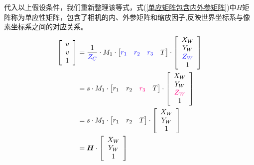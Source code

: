 \documentclass{article}
\begin{document}
代入以上假设条件，我们重新整理该等式，式(\ref{单应矩阵包含内外参矩阵})中$H$矩阵称为单应性矩阵，包含了相机的内、外参矩阵和缩放因子,反映世界坐标系与像素坐标系之间的对应关系。
	\begin{align}
	\left[ \begin{array}{c}
		u\\
		v\\
		1\\
	\end{array} \right] &=\frac{1}{{\color{blue} Z_C}}\cdot M_1\cdot \left[ \begin{matrix}
		{\color{blue} r_1}&		{\color{blue} r_2}&		{\color{blue} r_3}&		T\\
	\end{matrix} \right] \cdot \left[ \begin{array}{c}
		X_W\\
		Y_W\\
		{\color{blue} Z_W}\\
		1\\
	\end{array} \right] \nonumber
	\\
	&=s \cdot M_1\cdot \left[ \begin{matrix}
		r_1&		r_2&		{\color[RGB]{255, 0, 128} r_3}&		T\\
	\end{matrix} \right] \cdot \left[ \begin{array}{c}
		X_W\\
		Y_W\\
		{\color[RGB]{255, 0, 128} Z_W}\\
		1\\
	\end{array} \right] \nonumber
	\\
	&=s \cdot M_1\cdot \left[ \begin{matrix}
		r_1&		r_2&		T\\
	\end{matrix} \right] \cdot \left[ \begin{array}{c}
		X_W\\
		Y_W\\
		1\\
	\end{array} \right] \nonumber
	\\
	&=\boldsymbol{H}\cdot \left[ \begin{array}{c}
		X_W\\
		Y_W\\
		1\\
	\end{array} \right]  	\label{单应矩阵包含内外参矩阵}	
\end{align}
\end{document}
